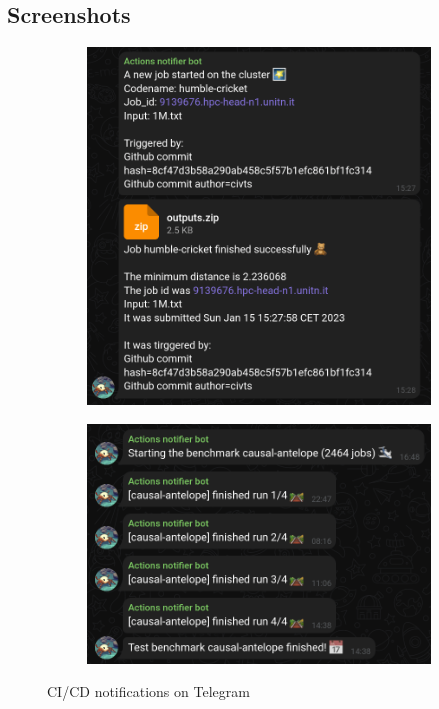 \subsection{Screenshots}

\begin{figure}[hb]
      \centering
      \begin{subfigure}[b]{0.35\linewidth}
            \includegraphics[width=\linewidth]{../assets/images/ci_notification.png}
            \vspace{8pt}
      \end{subfigure}
      \hspace{1cm}
      \begin{subfigure}[b]{0.35\linewidth}
            \includegraphics[width=\linewidth]{../assets/images/benchmark_notifications.png}
            \vspace{8pt}
      \end{subfigure}
      \caption{CI/CD notifications on Telegram}
\end{figure}
